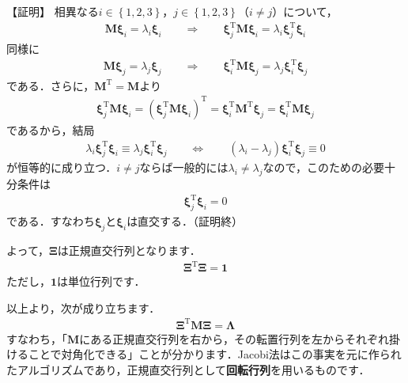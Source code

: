﻿\documentclass[a4paper]{jsarticle}
\begin{document}
【証明】
相異なる$i\in\left\{1,2,3\right\}$，$j\in\left\{1,2,3\right\}$（$i\neq j$）について，
\begin{align*}
\boldsymbol{M}\boldsymbol{\xi}_{i}=\lambda_{i}\boldsymbol{\xi}_{i}
\qquad\Rightarrow\qquad
\boldsymbol{\xi}_{j}^{\mathrm{T}}\boldsymbol{M}\boldsymbol{\xi}_{i}=\lambda_{i}\boldsymbol{\xi}_{j}^{\mathrm{T}}\boldsymbol{\xi}_{i}
\end{align*}
同様に
\begin{align*}
\boldsymbol{M}\boldsymbol{\xi}_{j}=\lambda_{j}\boldsymbol{\xi}_{j}
\qquad\Rightarrow\qquad
\boldsymbol{\xi}_{i}^{\mathrm{T}}\boldsymbol{M}\boldsymbol{\xi}_{j}=\lambda_{j}\boldsymbol{\xi}_{i}^{\mathrm{T}}\boldsymbol{\xi}_{j}
\end{align*}
である．さらに，$\boldsymbol{M}^{\mathrm{T}}=\boldsymbol{M}$より
\begin{align*}
\boldsymbol{\xi}_{j}^{\mathrm{T}}\boldsymbol{M}\boldsymbol{\xi}_{i}
=
(\boldsymbol{\xi}_{j}^{\mathrm{T}}\boldsymbol{M}\boldsymbol{\xi}_{i})^{\mathrm{T}}
=
\boldsymbol{\xi}_{i}^{\mathrm{T}}\boldsymbol{M}^{\mathrm{T}}\boldsymbol{\xi}_{j}
=
\boldsymbol{\xi}_{i}^{\mathrm{T}}\boldsymbol{M}\boldsymbol{\xi}_{j}
\end{align*}
であるから，結局
\begin{align*}
\lambda_{i}\boldsymbol{\xi}_{j}^{\mathrm{T}}\boldsymbol{\xi}_{i}\equiv\lambda_{j}\boldsymbol{\xi}_{i}^{\mathrm{T}}\boldsymbol{\xi}_{j}
\qquad\Leftrightarrow\qquad
(\lambda_{i}-\lambda_{j})\boldsymbol{\xi}_{i}^{\mathrm{T}}\boldsymbol{\xi}_{j}\equiv 0
\end{align*}
が恒等的に成り立つ．$i\neq j$ならば一般的には$\lambda_{i}\neq\lambda_{j}$なので，このための必要十分条件は
\begin{align*}
\boldsymbol{\xi}_{j}^{\mathrm{T}}\boldsymbol{\xi}_{i}=0
\end{align*}
である．すなわち$\boldsymbol{\xi}_{j}$と$\boldsymbol{\xi}_{i}$は直交する．（証明終）

よって，$\boldsymbol{\Xi}$は正規直交行列となります．
\begin{align*}
\boldsymbol{\Xi}^{\mathrm{T}}\boldsymbol{\Xi}=\boldsymbol{1}
\end{align*}
ただし，$\boldsymbol{1}$は単位行列です．

以上より，次が成り立ちます．
\begin{align*}
\boldsymbol{\Xi}^{\mathrm{T}}\boldsymbol{M}\boldsymbol{\Xi}=\boldsymbol{\Lambda}
\end{align*}
すなわち，「$\boldsymbol{M}$にある正規直交行列を右から，その転置行列を左からそれぞれ掛けることで対角化できる」ことが分かります．Jacobi法はこの事実を元に作られたアルゴリズムであり，正規直交行列として{\bf 回転行列}を用いるものです．
\end{document}
